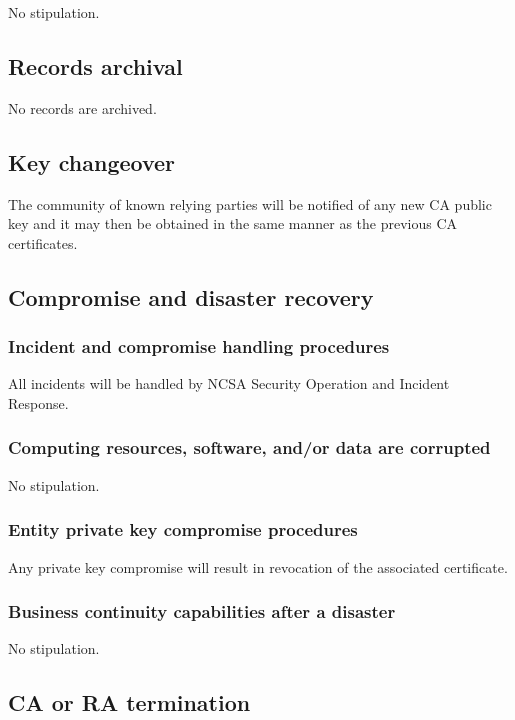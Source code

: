 \documentclass[10pt]{article}
\begin{document}
No stipulation.

\subsection{Records archival}

No records are archived.

\subsection{Key changeover}

The community of known relying parties will be notified of any new CA
public key and it may then be obtained in the same manner as the
previous CA certificates.

\subsection{Compromise and disaster recovery}

\subsubsection{Incident and compromise handling procedures}

All incidents will be handled by NCSA Security Operation and Incident
Response.

\subsubsection{Computing resources, software, and/or data are corrupted}

No stipulation.

\subsubsection{Entity private key compromise procedures}

Any private key compromise will result in revocation of the associated
certificate.

\subsubsection{Business continuity capabilities after a disaster}

No stipulation.

\subsection{CA or RA termination}
\end{document}
